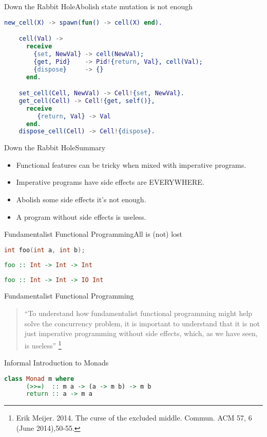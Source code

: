 \documentclass[rail]{beamer}
\begin{document}
\begin{frame}[fragile]{Down the Rabbit Hole}{Abolish state mutation is not enough}
  \begin{lstlisting}[language=erlang]
    new_cell(X) -> spawn(fun() -> cell(X) end).

    cell(Val) ->
      receive
        {set, NewVal} -> cell(NewVal);
        {get, Pid}    -> Pid!{return, Val}, cell(Val);
        {dispose}     -> {}
      end.

    set_cell(Cell, NewVal) -> Cell!{set, NewVal}.
    get_cell(Cell) -> Cell!{get, self()},
      receive
         {return, Val} -> Val
      end.
    dispose_cell(Cell) -> Cell!{dispose}.

  \end{lstlisting}
\end{frame}

\begin{frame}{Down the Rabbit Hole}{Summary}
  \begin{itemize}[<+->]
  \item Functional features can be tricky when mixed with imperative programs.
  \item Imperative programs have side effects are EVERYWHERE.
  \item Abolish some side effects it's not enough.
  \item A program without side effects is useless.
  \end{itemize}
\end{frame}

\begin{frame}[fragile]{Fundamentalist Functional Programming}{All is (not) lost}
  \begin{lstlisting}[language=C]
    int foo(int a, int b);
  \end{lstlisting}
  \pause
  \vspace{1cm}
  \begin{lstlisting}[language=Haskell]
    foo :: Int -> Int -> Int
  \end{lstlisting}
  \pause
  \vspace{1cm}
  \begin{lstlisting}[language=Haskell]
    foo :: Int -> Int -> IO Int
  \end{lstlisting}
\end{frame}

\begin{frame}{Fundamentalist Functional Programming}
  \begin{quote}
    ``To understand how fundamentalist functional programming might
    help solve the concurrency problem, it is important to understand
    that it is not just imperative programming without side effects,
    which, as we have seen, is useless''
    \footnote[frame,1] {Erik Meijer. 2014. The curse of the
      excluded middle. Commun. ACM 57, 6 (June 2014),50-55.}
  \end{quote}
\end{frame}

\begin{frame}[fragile]{Informal Introduction to Monads}
  \begin{lstlisting}[language=Haskell]
    class Monad m where
      (>>=)  :: m a -> (a -> m b) -> m b
      return :: a -> m a
  \end{lstlisting}
\end{frame}
\end{document}
